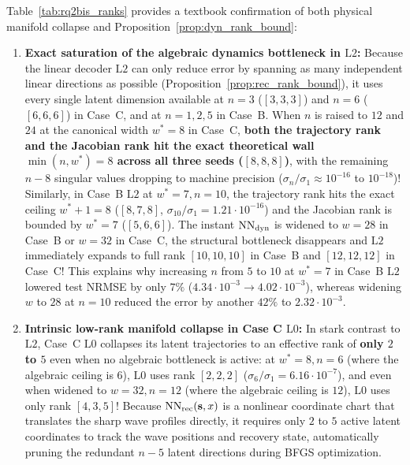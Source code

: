 Table~\ref{tab:rq2bis_ranks} provides a textbook confirmation of both physical manifold collapse and Proposition~\ref{prop:dyn_rank_bound}:
\begin{enumerate}[leftmargin=2em]
  \item \textbf{Exact saturation of the algebraic dynamics bottleneck in $\mathrm{L2}$:} Because the linear decoder $\mathrm{L2}$ can only reduce error by spanning as many independent linear directions as possible (Proposition~\ref{prop:rec_rank_bound}), it uses every single latent dimension available at $n=3$ ($[3,3,3]$) and $n=6$ ($[6,6,6]$) in Case~C, and at $n=1,2,5$ in Case~B. When $n$ is raised to $12$ and $24$ at the canonical width $w^* = 8$ in Case~C, \textbf{both the trajectory rank and the Jacobian rank hit the exact theoretical wall $\min(n, w^*) = 8$ across all three seeds ($[8,8,8]$)}, with the remaining $n - 8$ singular values dropping to machine precision ($\sigma_n/\sigma_1 \approx 10^{-16}$ to $10^{-18}$)! Similarly, in Case~B $\mathrm{L2}$ at $w^* = 7, n = 10$, the trajectory rank hits the exact ceiling $w^* + 1 = 8$ ($[8,7,8]$, $\sigma_{10}/\sigma_1 = 1.21\cdot 10^{-16}$) and the Jacobian rank is bounded by $w^* = 7$ ($[5,6,6]$). The instant $\mathrm{NN}_{\mathrm{dyn}}$ is widened to $w = 28$ in Case~B or $w = 32$ in Case~C, the structural bottleneck disappears and $\mathrm{L2}$ immediately expands to full rank \textbf{$[10,10,10]$} in Case~B and \textbf{$[12,12,12]$} in Case~C! This explains why increasing $n$ from $5$ to $10$ at $w^*=7$ in Case~B $\mathrm{L2}$ lowered test NRMSE by only $7\%$ ($4.34\cdot 10^{-3} \to 4.02\cdot 10^{-3}$), whereas widening $w$ to $28$ at $n=10$ reduced the error by another $42\%$ to $2.32\cdot 10^{-3}$.
  \item \textbf{Intrinsic low-rank manifold collapse in Case C $\mathrm{L0}$:} In stark contrast to $\mathrm{L2}$, Case~C $\mathrm{L0}$ collapses its latent trajectories to an effective rank of \textbf{only $2$ to $5$} even when no algebraic bottleneck is active: at $w^*=8, n=6$ (where the algebraic ceiling is $6$), $\mathrm{L0}$ uses rank $[2,2,2]$ ($\sigma_6/\sigma_1 = 6.16\cdot 10^{-7}$), and even when widened to $w=32, n=12$ (where the algebraic ceiling is $12$), $\mathrm{L0}$ uses only rank \textbf{$[4,3,5]$}! Because $\mathrm{NN}_{\mathrm{rec}}(\mathbf{s},x)$ is a nonlinear coordinate chart that translates the sharp wave profiles directly, it requires only $2$ to $5$ active latent coordinates to track the wave positions and recovery state, automatically pruning the redundant $n - 5$ latent directions during BFGS optimization.
\end{enumerate}
